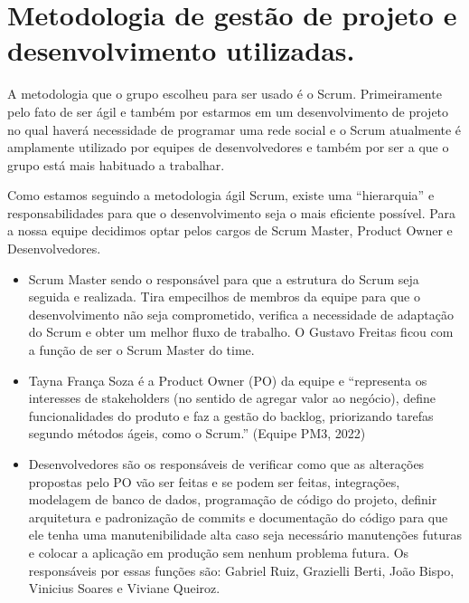
\chapter[Metodologia de gestão de projeto e desenvolvimento utilizadas. ]{Metodologia de gestão de projeto e desenvolvimento utilizadas.}

A metodologia que o grupo escolheu para ser usado é o Scrum. Primeiramente pelo fato de ser ágil e também por estarmos em um desenvolvimento de projeto no qual haverá necessidade de programar uma rede social e o Scrum atualmente é amplamente utilizado por equipes de desenvolvedores e também por ser a que o grupo está mais habituado a trabalhar.

Como estamos seguindo a metodologia ágil Scrum, existe uma “hierarquia” e responsabilidades para que o desenvolvimento seja o mais eficiente possível. Para a nossa equipe decidimos optar pelos cargos de Scrum Master, Product Owner e Desenvolvedores.

\begin{itemize}
    \item Scrum Master sendo o responsável para que a estrutura do Scrum seja seguida e realizada. Tira empecilhos de membros da equipe para que o desenvolvimento não seja comprometido, verifica a necessidade de adaptação do Scrum e obter um melhor fluxo de trabalho. O Gustavo Freitas ficou com a função de ser o Scrum Master do time.
    
    \item Tayna França Soza é a Product Owner (PO) da equipe e “representa os interesses de stakeholders (no sentido de agregar valor ao negócio), define funcionalidades do produto e faz a gestão do backlog, priorizando tarefas segundo métodos ágeis, como o Scrum.” (Equipe PM3, 2022)
    
    \item Desenvolvedores são os responsáveis de verificar como que as alterações propostas pelo PO vão ser feitas e se podem ser feitas, integrações, modelagem de banco de dados, programação de código do projeto, definir arquitetura e padronização de commits e documentação do código para que ele tenha uma manutenibilidade alta caso seja necessário manutenções futuras e colocar a aplicação em produção sem nenhum problema futura. Os responsáveis por essas funções são: Gabriel Ruiz, Grazielli Berti, João Bispo, Vinicius Soares e Viviane Queiroz.
    
\end{itemize}

